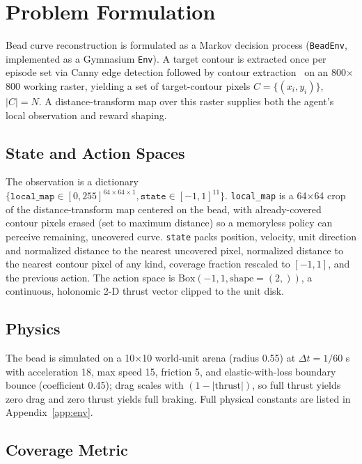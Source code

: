 \documentclass[conference]{IEEEtran}
\begin{document}
\section{Problem Formulation}
\label{sec:formulation}

Bead curve reconstruction is formulated as a Markov decision process (\texttt{BeadEnv}, implemented as a Gymnasium \texttt{Env}). A target contour is extracted once per episode set via Canny edge detection followed by contour extraction~\cite{canny1986edge,suzuki1985topological} on an 800$\times$800 working raster, yielding a set of target-contour pixels $C=\{(x_i,y_i)\}$, $|C|=N$. A distance-transform map over this raster supplies both the agent's local observation and reward shaping.

\subsection{State and Action Spaces}

The observation is a dictionary $\{\texttt{local\_map}\in[0,255]^{64\times64\times1}, \texttt{state}\in[-1,1]^{11}\}$. \texttt{local\_map} is a 64$\times$64 crop of the distance-transform map centered on the bead, with already-covered contour pixels erased (set to maximum distance) so a memoryless policy can perceive remaining, uncovered curve. \texttt{state} packs position, velocity, unit direction and normalized distance to the nearest uncovered pixel, normalized distance to the nearest contour pixel of any kind, coverage fraction rescaled to $[-1,1]$, and the previous action. The action space is $\text{Box}(-1,1,\text{shape}=(2,))$, a continuous, holonomic 2-D thrust vector clipped to the unit disk.

\subsection{Physics}

The bead is simulated on a 10$\times$10 world-unit arena (radius 0.55) at $\Delta t = 1/60$ s with acceleration 18, max speed 15, friction 5, and elastic-with-loss boundary bounce (coefficient 0.45); drag scales with $(1-|\text{thrust}|)$, so full thrust yields zero drag and zero thrust yields full braking. Full physical constants are listed in Appendix~\ref{app:env}.

\subsection{Coverage Metric}
\end{document}
